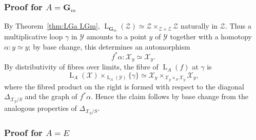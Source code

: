 \documentclass[12pt, oneside]{amsart}
\numberwithin{equation}{section}
\theoremstyle{remark}
\theoremstyle{plain}
\newcommand{\Loop}{\operatorname{L}}
\newcommand{\YY}{\mathcal{Y}}
\newcommand{\ZZ}{\mathcal{Z}}
\newcommand{\XX}{\mathcal{X}}
\newcommand{\GGm}{\mathbf{G}_{m}}
\begin{document}
\subsubsection{Proof for $A = \GGm$}
By Theorem~\ref{thm:LGa LGm}, $\Loop_{\GGm}(\ZZ) \simeq \ZZ \times_{\ZZ \times \ZZ} \ZZ$ naturally in $\ZZ$.
Thus a multiplicative loop $\gamma$ in $\YY$ amounts to a point $y$ of $\YY$ together with a homotopy $\alpha : y \simeq y$; by base change, this determines an automorphism
\[f^*\alpha : \XX_y \simeq \XX_y.\]
By distributivity of fibres over limits, the fibre of $\Loop_A(f)$ at $\gamma$ is
\[
  \Loop_A(\XX) \times_{\Loop_A(\YY)} \{\gamma\}
  \simeq \XX_y \times_{\XX_y \times_S \XX_y} \XX_y,
\]
where the fibred product on the right is formed with respect to the diagonal $\Delta_{\XX_y/S}$ and the graph of $f^*\alpha$.
Hence the claim follows by base change from the analogous properties of $\Delta_{\XX_y/S}$.

\subsubsection{Proof for $A = E$}
\end{document}
